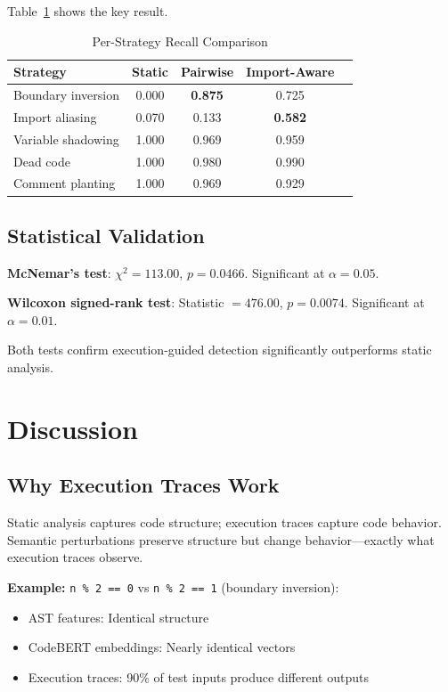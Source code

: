 \documentclass[conference]{IEEEtran}
\begin{document}
Table~\ref{tab:per-strategy} shows the key result.

\begin{table}[h]
\centering
\caption{Per-Strategy Recall Comparison}
\label{tab:per-strategy}
\begin{tabular}{@{}lcccc@{}}
\toprule
\textbf{Strategy} & \textbf{Static} & \textbf{Pairwise} & \textbf{Import-Aware} \\
\midrule
Boundary inversion & 0.000 & \textbf{0.875} & 0.725 \\
Import aliasing & 0.070 & 0.133 & \textbf{0.582} \\
Variable shadowing & 1.000 & 0.969 & 0.959 \\
Dead code & 1.000 & 0.980 & 0.990 \\
Comment planting & 1.000 & 0.969 & 0.929 \\
\bottomrule
\end{tabular}
\end{table}

\subsection{Statistical Validation}

\textbf{McNemar's test}: $\chi^2 = 113.00$, $p = 0.0466$. Significant at $\alpha = 0.05$.

\textbf{Wilcoxon signed-rank test}: Statistic $= 476.00$, $p = 0.0074$. Significant at $\alpha = 0.01$.

Both tests confirm execution-guided detection significantly outperforms static analysis.

\section{Discussion}
\label{sec:discussion}

\subsection{Why Execution Traces Work}

Static analysis captures code structure; execution traces capture code behavior. Semantic perturbations preserve structure but change behavior---exactly what execution traces observe.

\textbf{Example:} \texttt{n \% 2 == 0} vs \texttt{n \% 2 == 1} (boundary inversion):
\begin{itemize}
    \item AST features: Identical structure
    \item CodeBERT embeddings: Nearly identical vectors
    \item Execution traces: 90\% of test inputs produce different outputs
\end{itemize}
\end{document}
